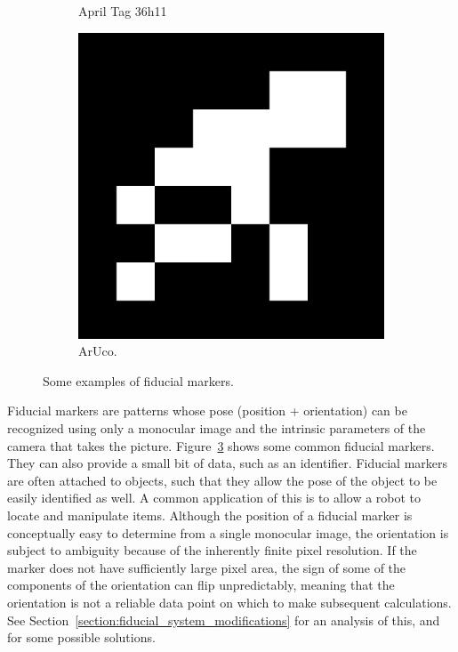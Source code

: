 \begin{figure}[]
\begin{subfigure}[b]{0.2\linewidth}
        \caption{April Tag 36h11}
        \label{figure:apriltag36h11}
    \end{subfigure}
    \begin{subfigure}[b]{0.2\linewidth}
        \includegraphics[width=\textwidth]{images/aruco_33}
        \caption{ArUco.}
        \label{figure:aruco33}
    \end{subfigure}
    \caption{Some examples of fiducial markers.}
    \label{figure:fiducial_markers}
\end{figure}

Fiducial markers are patterns whose pose (position + orientation) can be recognized
using only a monocular image and the intrinsic parameters of the camera that takes the picture.
Figure~\ref{figure:fiducial_markers} shows some common fiducial markers.
They can also provide a small bit of data, such as an identifier.
Fiducial markers are often attached to objects,
such that they allow the pose of the object to be easily identified as well.
A common application of this is to allow a robot to locate and manipulate items.
Although the position of a fiducial marker is conceptually easy to determine from
a single monocular image, the orientation is subject to ambiguity
because of the inherently finite pixel resolution.
If the marker does not have sufficiently large pixel area, the sign of some of the
components of the orientation can flip unpredictably, meaning that the orientation
is not a reliable data point on which to make subsequent calculations.
See Section~\ref{section:fiducial_system_modifications}
for an analysis of this, and for some possible solutions.
